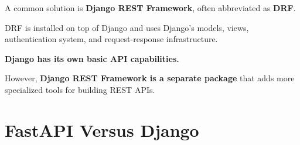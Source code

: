 \documentclass[a4paper]{article}
\begin{document}
        A common solution is \textbf{Django REST Framework}, often abbreviated
        as \textbf{DRF}.
        
        DRF is installed on top of Django and uses Django's models, views,
        authentication system, and request-response infrastructure.
        
        \begin{tcolorbox}[
            colback=lightblue,
            colframe=headerblue,
            title=\textbf{Do not confuse these two statements},
            fonttitle=\bfseries,
            breakable
        ]
            \textbf{Django has its own basic API capabilities.}
            
            However, \textbf{Django REST Framework is a separate package} that adds
            more specialized tools for building REST APIs.
        \end{tcolorbox}
    
    
    \section*{FastAPI Versus Django}
        
\end{document}
